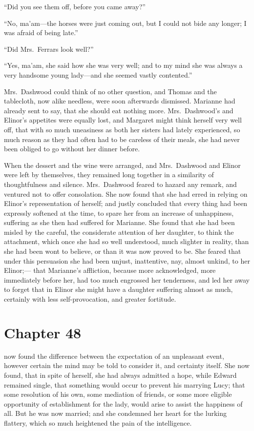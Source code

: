``Did you see them off, before you came away?''

``No, ma'am---the horses were just coming out, but I
could not bide any longer; I was afraid of being late.''

``Did Mrs.\ Ferrars look well?''

``Yes, ma'am, she said how she was very well;
and to my mind she was always a very handsome young
lady---and she seemed vastly contented.''

Mrs.\ Dashwood could think of no other question,
and Thomas and the tablecloth, now alike needless,
were soon afterwards dismissed.  Marianne had already sent
to say, that she should eat nothing more.  Mrs.\ Dashwood's
and Elinor's appetites were equally lost, and Margaret
might think herself very well off, that with so much
uneasiness as both her sisters had lately experienced,
so much reason as they had often had to be careless
of their meals, she had never been obliged to go without
her dinner before.

When the dessert and the wine were arranged,
and Mrs.\ Dashwood and Elinor were left by themselves,
they remained long together in a similarity of thoughtfulness
and silence.  Mrs.\ Dashwood feared to hazard any remark,
and ventured not to offer consolation.  She now found
that she had erred in relying on Elinor's representation
of herself; and justly concluded that every thing
had been expressly softened at the time, to spare her
from an increase of unhappiness, suffering as she then
had suffered for Marianne.  She found that she had been
misled by the careful, the considerate attention of
her daughter, to think the attachment, which once she
had so well understood, much slighter in reality, than
she had been wont to believe, or than it was now proved
to be.  She feared that under this persuasion she had
been unjust, inattentive, nay, almost unkind, to her Elinor;---%
that Marianne's affliction, because more acknowledged,
more immediately before her, had too much engrossed
her tenderness, and led her away to forget that in Elinor
she might have a daughter suffering almost as much,
certainly with less self-provocation, and greater fortitude.



\chapter{Chapter 48}


 now found the difference between the expectation
of an unpleasant event, however certain the mind may be told
to consider it, and certainty itself.  She now found, that
in spite of herself, she had always admitted a hope,
while Edward remained single, that something would occur
to prevent his marrying Lucy; that some resolution of
his own, some mediation of friends, or some more eligible
opportunity of establishment for the lady, would arise
to assist the happiness of all.  But he was now married;
and she condemned her heart for the lurking flattery,
which so much heightened the pain of the intelligence.

